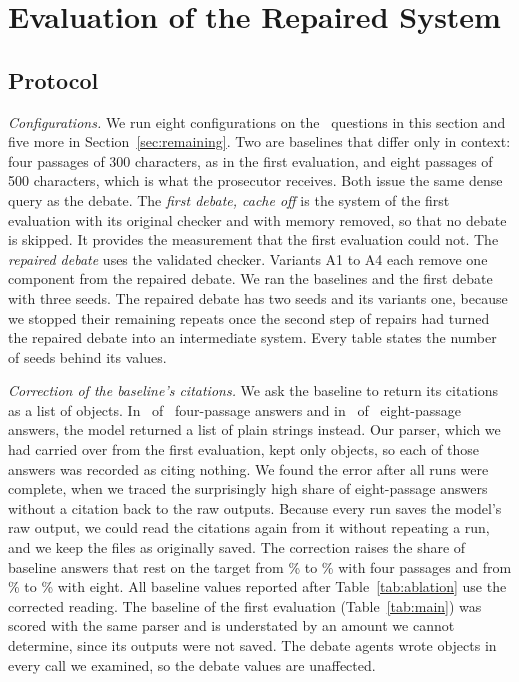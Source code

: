 \documentclass[conference]{IEEEtran}
\begin{document}
\section{Evaluation of the Repaired System}\label{sec:postaudit}

\subsection{Protocol}
\emph{Configurations.} We run eight configurations on the \ResTestCases\ questions in this section and five more in Section~\ref{sec:remaining}. Two are baselines that differ only in context: four passages of 300 characters, as in the first evaluation, and eight passages of 500 characters, which is what the prosecutor receives. Both issue the same dense query as the debate. The \emph{first debate, cache off} is the system of the first evaluation with its original checker and with memory removed, so that no debate is skipped. It provides the measurement that the first evaluation could not. The \emph{repaired debate} uses the validated checker. Variants A1 to A4 each remove one component from the repaired debate. We ran the baselines and the first debate with three seeds. The repaired debate has two seeds and its variants one, because we stopped their remaining repeats once the second step of repairs had turned the repaired debate into an intermediate system. Every table states the number of seeds behind its values.

\emph{Correction of the baseline's citations.} We ask the baseline to return its citations as a list of objects. In \ResParseBaseFourChanged\ of \ResParseBaseFourAnswers\ four-passage answers and in \ResParseBaseEightChanged\ of \ResParseBaseEightAnswers\ eight-passage answers, the model returned a list of plain strings instead. Our parser, which we had carried over from the first evaluation, kept only objects, so each of those answers was recorded as citing nothing. We found the error after all runs were complete, when we traced the surprisingly high share of eight-passage answers without a citation back to the raw outputs. Because every run saves the model's raw output, we could read the citations again from it without repeating a run, and we keep the files as originally saved. The correction raises the share of baseline answers that rest on the target from \ResParseBaseFourTargetAsSaved\% to \ResPaBaseFourTargetAnswer\% with four passages and from \ResParseBaseEightTargetAsSaved\% to \ResPaBaseEightTargetAnswer\% with eight. All baseline values reported after Table~\ref{tab:ablation} use the corrected reading. The baseline of the first evaluation (Table~\ref{tab:main}) was scored with the same parser and is understated by an amount we cannot determine, since its outputs were not saved. The debate agents wrote objects in every call we examined, so the debate values are unaffected.
\end{document}
